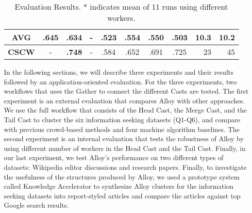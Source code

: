 \begin{table}
\begin{tabular}{ c c c c c c c c r r}
	\hline
	\textbf{AVG} & .645 & \textbf{.634} & - & .523 & .554 & .550 & .503 & 10.3 & 10.2 \\
	\hline
	
	
	\textbf{CSCW} & - &\textbf{.748} & - & .584 & .652 & .691 & .725 & 23 & 45 \\
	

%
    \hline
  \end{tabular}
  \caption[Evaluation results for Alloy]{Evaluation Results. * indicates mean of 11 runs using different workers.\footnotemark}
  
  \label{tab:results}
\end{table}


In the following sections, we will describe three experiments and their
results followed by an application-oriented evaluation. For the three experiments, two workflows that uses the Gather to connect the different Casts are
tested.  The first experiment is an external evaluation that compares Alloy
with other approaches. We use the full workflow that consists of the Head Cast,
the Merge Cast, and the Tail Cast to cluster the six information seeking
datasets (Q1-Q6), and compare with previous crowd-based methods and four
machine algorithm baselines.  The second experiment is an internal evaluation
that tests the robustness of Alloy by using different number of workers in the
Head Cast and the Tail Cast.  Finally, in our last experiment, we test Alloy's
performance on two different types of datasets: Wikipedia editor discussions
and research papers. Finally, to investigate the usefulness of the structures produced by Alloy, we used a prototype system called Knowledge Accelerator \cite{ka} to synthesize Alloy clusters for the information seeking datasets into report-styled articles and compare the articles against top Google search results.

